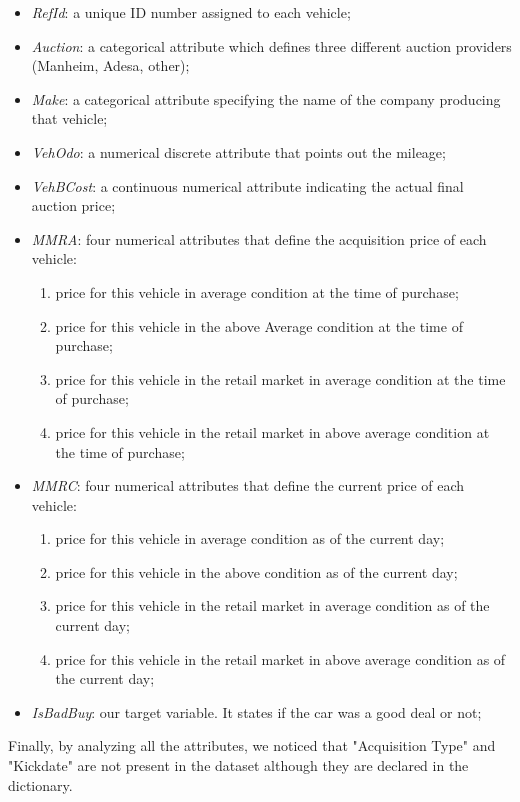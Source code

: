 \documentclass{article}
\begin{document}
	\begin{itemize}
		\item \emph{RefId}: a unique ID number assigned to each vehicle;
		\item \emph{Auction}: a categorical attribute which defines three different auction providers (Manheim, Adesa, other);
		\item \emph{Make}: a categorical attribute specifying the name of the company producing that vehicle;
		\item \emph{VehOdo}: a numerical discrete attribute that points out the mileage;
		\item \emph{VehBCost}: a continuous numerical attribute indicating the actual final auction price;
		\item \emph{MMRA}: four numerical attributes that define the acquisition price of each vehicle:
		\begin{enumerate}
			\item price for this vehicle in average condition at the time of purchase; 
			\item price for this vehicle in the above Average condition at the time of purchase;
			\item price for this vehicle in the retail market in average condition at the time of purchase;
			\item price for this vehicle in the retail market in above average condition at the time of purchase;
		\end{enumerate}
		\item \emph{MMRC}: four numerical attributes that define the current price of each vehicle:
		\begin{enumerate}
			\item price for this vehicle in average condition as of the current day;
			\item price for this vehicle in the above condition as of the current day;
			\item price for this vehicle in the retail market in average condition as of the current day;
			\item price for this vehicle in the retail market in above average condition as of the current day;
		\end{enumerate}
		\item \emph{IsBadBuy}: our target variable. It states if the car was a good deal or not;
	\end{itemize}
	
	Finally, by analyzing all the attributes, we noticed that "Acquisition Type" and "Kickdate" are not present in the dataset although they are declared in the dictionary.
	
\end{document}
